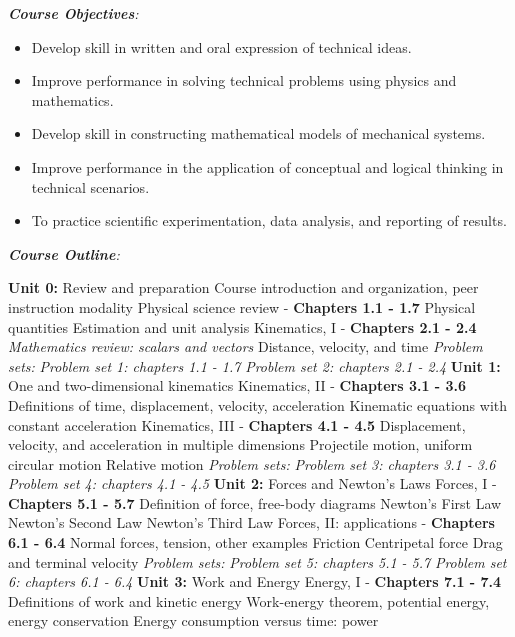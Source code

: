 \documentclass[10pt]{article}
\begin{document}
\noindent
\textit{\textbf{Course Objectives}:}
\begin{itemize}
\item Develop skill in written and oral expression of technical ideas.
\item Improve performance in solving technical problems using physics and mathematics.
\item Develop skill in constructing mathematical models of mechanical systems.
\item Improve performance in the application of conceptual and logical thinking in technical scenarios.
\item To practice scientific experimentation, data analysis, and reporting of results.
\end{itemize}
\clearpage
\twocolumn
\noindent
\textit{\textbf{Course Outline}:}
\begin{outline}[enumerate]
\1 \textbf{Unit 0:} Review and preparation 
\2 Course introduction and organization, peer instruction modality
\2 Physical science review - \textbf{Chapters 1.1 - 1.7}
\3 Physical quantities
\3 Estimation and unit analysis
\2 Kinematics, I - \textbf{Chapters 2.1 - 2.4}
\3 \textit{Mathematics review: scalars and vectors}
\3 Distance, velocity, and time
\2 \textit{Problem sets:}
\3 \textit{Problem set 1: chapters 1.1 - 1.7}
\3 \textit{Problem set 2: chapters 2.1 - 2.4}
\1 \textbf{Unit 1:} One and two-dimensional kinematics
\2 Kinematics, II - \textbf{Chapters 3.1 - 3.6}
\3 Definitions of time, displacement, velocity, acceleration
\3 Kinematic equations with constant acceleration
\2 Kinematics, III - \textbf{Chapters 4.1 - 4.5}
\3 Displacement, velocity, and acceleration in multiple dimensions
\3 Projectile motion, uniform circular motion
\3 Relative motion
\2 \textit{Problem sets:}
\3 \textit{Problem set 3: chapters 3.1 - 3.6}
\3 \textit{Problem set 4: chapters 4.1 - 4.5}
\1 \textbf{Unit 2:} Forces and Newton's Laws
\2 Forces, I - \textbf{Chapters 5.1 - 5.7}
\3 Definition of force, free-body diagrams
\3 Newton's First Law
\3 Newton's Second Law
\3 Newton's Third Law
\2 Forces, II: applications - \textbf{Chapters 6.1 - 6.4}
\3 Normal forces, tension, other examples
\3 Friction
\3 Centripetal force
\3 Drag and terminal velocity
\2 \textit{Problem sets:}
\3 \textit{Problem set 5: chapters 5.1 - 5.7}
\3 \textit{Problem set 6: chapters 6.1 - 6.4}
\1 \textbf{Unit 3:} Work and Energy
\2 Energy, I - \textbf{Chapters 7.1 - 7.4}
\3 Definitions of work and kinetic energy
\3 Work-energy theorem, potential energy, energy conservation
\3 Energy consumption versus time: power

\end{outline}
\end{document}

